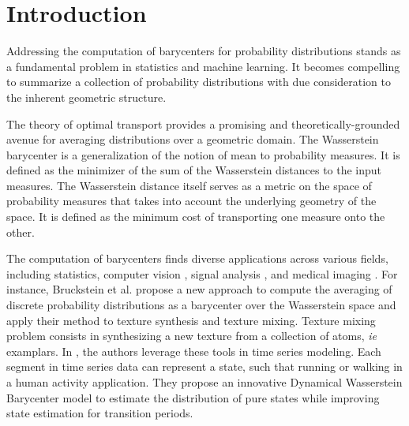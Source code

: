 \section{Introduction}


Addressing the computation of barycenters for probability distributions  stands as a fundamental problem in statistics and machine learning. It becomes compelling to summarize a collection of probability distributions with due consideration to the inherent geometric structure. 

The theory of optimal transport provides a promising and theoretically-grounded avenue for averaging distributions over a geometric domain. The Wasserstein barycenter is a generalization of the notion of mean to probability measures. It is defined as the minimizer of the sum of the Wasserstein distances to the input measures. The Wasserstein distance itself serves as a metric on the space of probability measures that takes into account the underlying geometry of the space. It is defined as the minimum cost of transporting one measure onto the other. 

The computation of barycenters finds diverse applications across various fields, including statistics, computer vision \cite{bruckstein_wasserstein_2012, korotin_wasserstein_nodate}, signal analysis \cite{cheng_dynamical_2021,cheng_nonparametric_2023}, and medical imaging \cite{dvurechenskii_decentralize_2018}. 
For instance, Bruckstein et al. \cite{bruckstein_wasserstein_2012} propose a new approach to compute the averaging of discrete probability distributions as a barycenter over the Wasserstein space and apply their method to texture synthesis and texture mixing. Texture mixing problem consists in synthesizing a new texture from a collection of atoms, \textit{ie} examplars. In \cite{cheng_dynamical_2021}, the authors leverage these tools in time series modeling. Each segment in time series data can represent a state, such that running or walking in a human activity application. They propose an innovative Dynamical Wasserstein Barycenter model to estimate the distribution of pure states while improving state estimation for transition periods. \\

